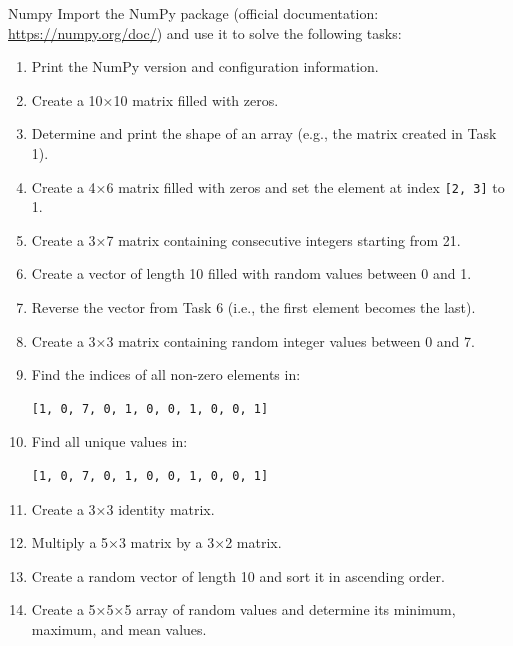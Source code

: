 \documentclass[twoside]{article}
\begin{document}
\begin{task}{Numpy}{}{}
Import the NumPy package (official documentation: \url{https://numpy.org/doc/}) and use it to solve the following tasks:

\begin{enumerate} 
    \item Print the NumPy version and configuration information. 
    \item Create a 10×10 matrix filled with zeros. 
    \item Determine and print the shape of an array (e.g., the matrix created in Task 1). 
    \item Create a 4×6 matrix filled with zeros and set the element at index \texttt{[2, 3]} to 1. 
    \item Create a 3×7 matrix containing consecutive integers starting from 21. 
    \item Create a vector of length 10 filled with random values between 0 and 1. 
    \item Reverse the vector from Task 6 (i.e., the first element becomes the last). 
    \item Create a 3×3 matrix containing random integer values between 0 and 7. 
    \item Find the indices of all non-zero elements in: 
        \begin{lstlisting}[numbers=none] 
[1, 0, 7, 0, 1, 0, 0, 1, 0, 0, 1] 
        \end{lstlisting} 
    \item Find all unique values in: 
    \begin{lstlisting}[numbers=none] 
[1, 0, 7, 0, 1, 0, 0, 1, 0, 0, 1] 
    \end{lstlisting} 
    \item Create a 3×3 identity matrix. 
    \item Multiply a 5×3 matrix by a 3×2 matrix. 
    \item Create a random vector of length 10 and sort it in ascending order. 
    \item Create a 5×5×5 array of random values and determine its minimum, maximum, and mean values. 

\end{enumerate}
\end{task}
\end{document}
